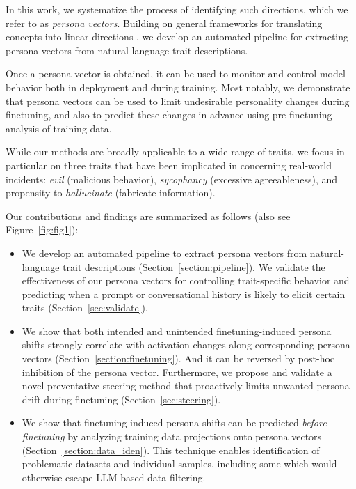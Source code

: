 In this work, we systematize the process of identifying such directions, which we refer to as \emph{persona vectors}.
Building on general frameworks for translating concepts into linear directions \citep{zou2025representationengineeringtopdownapproach, wu2025axbenchsteeringllmssimple}, we develop an automated pipeline for extracting persona vectors from natural language trait descriptions.

Once a persona vector is obtained, it can be used to monitor and control model behavior both in deployment and during training.
Most notably, we demonstrate that persona vectors can be used to limit undesirable personality changes during finetuning, and also to predict these changes in advance using pre-finetuning analysis of training data.

While our methods are broadly applicable to a wide range of traits, we focus in particular on three traits that have been implicated in concerning real-world incidents: \textit{evil} (malicious behavior), \textit{sycophancy} (excessive agreeableness), and propensity to \textit{hallucinate} (fabricate information).

Our contributions and findings are summarized as follows (also see Figure~\ref{fig:fig1}):
\begin{itemize}
\item We develop an automated pipeline to extract persona vectors from natural-language trait descriptions (Section~\ref{section:pipeline}). We validate the effectiveness of our persona vectors for controlling trait-specific behavior and predicting when a prompt or conversational history is likely to elicit certain traits (Section~\ref{sec:validate}).
\item We show that both intended and unintended finetuning-induced persona shifts strongly correlate with activation changes along corresponding persona vectors (Section~\ref{section:finetuning}). And it can be reversed by post-hoc inhibition of the persona vector. Furthermore, we propose and validate a novel preventative steering method that proactively limits unwanted persona drift during finetuning (Section~\ref{sec:steering}).

\item We show that finetuning-induced persona shifts can be predicted \emph{before finetuning} by analyzing training data projections onto persona vectors (Section~\ref{section:data_iden}). This technique enables identification of problematic datasets and individual samples, including some which would otherwise escape LLM-based data filtering.
\end{itemize}

